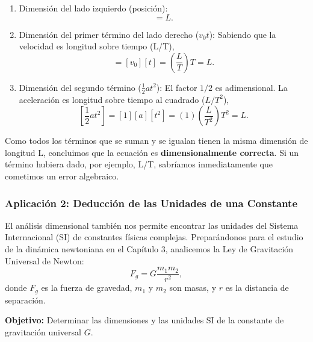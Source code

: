 \documentclass[11pt,a4paper]{book}
\begin{document}
\begin{enumerate}
    \item Dimensión del lado izquierdo (posición): 
    \begin{equation}
        [x] = \unit{L}.
    \end{equation}
    
    \item Dimensión del primer término del lado derecho ($v_0 t$): Sabiendo que la velocidad es longitud sobre tiempo (L/T),
    \begin{equation}
        [v_0 t] = [v_0][t] = \left(\frac{\unit{L}}{\unit{T}}\right)\unit{T} = \unit{L}.
    \end{equation}
    
    \item Dimensión del segundo término ($\frac{1}{2} a t^2$): El factor $1/2$ es adimensional. La aceleración es longitud sobre tiempo al cuadrado ($\unit{L}/\unit{T^2}$),
    \begin{equation}
        \left[\frac{1}{2} a t^2\right] = [1][a] [t^2] = (1)\left(\frac{\unit{L}}{\unit{T^2}}\right)\unit{T^2} = \unit{L}.
    \end{equation}
\end{enumerate}

Como todos los términos que se suman y se igualan tienen la misma dimensión de longitud L, concluimos que la ecuación es \textbf{dimensionalmente correcta}. Si un término hubiera dado, por ejemplo, L/T, sabríamos inmediatamente que cometimos un error algebraico.

\subsubsection{Aplicación 2: Deducción de las Unidades de una Constante}

El análisis dimensional también nos permite encontrar las unidades del Sistema Internacional (SI) de constantes físicas complejas. Preparándonos para el estudio de la dinámica newtoniana en el Capítulo 3, analicemos la Ley de Gravitación Universal de Newton:
\begin{equation}
    F_g = G \frac{m_1 m_2}{r^2},
\end{equation}
donde $F_g$ es la fuerza de gravedad, $m_1$ y $m_2$ son masas, y $r$ es la distancia de separación. 

\textbf{Objetivo:} Determinar las dimensiones y las unidades SI de la constante de gravitación universal $G$.
\end{document}
